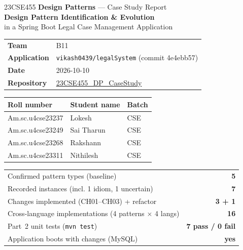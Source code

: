 \documentclass[11pt,a4paper]{article}
\begin{document}
\thispagestyle{empty}
\begin{tcolorbox}[enhanced,colback=brand,colframe=brand,arc=3pt,boxrule=0pt,
  left=16pt,right=16pt,top=14pt,bottom=14pt]
  {\color{white}\fontsize{13}{15}\selectfont 23CSE455 \textbf{Design Patterns} --- Case Study Report}\\[6pt]
  {\color{white}\LARGE\bfseries Design Pattern Identification \& Evolution}\\[2pt]
  {\color{white}\large in a Spring Boot Legal Case Management Application}
\end{tcolorbox}

\vspace{4pt}
\begin{tabularx}{\linewidth}{@{}lX@{}}
\textbf{Team} & B11\\
\textbf{Application} & \texttt{vikash0439/legalSystem} \textcolor{muted}{(commit 4e4ebb57)}\\
\textbf{Date} & 2026-10-10\\
\textbf{Repository} & \href{https://github.com/aswathymohan-amrita/23CSE455_DP_CaseStudy}{23CSE455\_DP\_CaseStudy}\\
\end{tabularx}

\vspace{6pt}
\begin{tabularx}{\linewidth}{@{}llX@{}}\toprule
\rowcolor{panelbg}\textbf{Roll number} & \textbf{Student name} & \textbf{Batch}\\\midrule
Am.sc.u4cse23237 & Lokesh & CSE\\
Am.sc.u4cse23249 & Sai Tharun & CSE\\
Am.sc.u4cse23268 & Rakshann & CSE\\
Am.sc.u4cse23311 & Nithilesh & CSE\\\bottomrule
\end{tabularx}

\begin{tcolorbox}[enhanced,colback=panelbg,colframe=accent,arc=3pt,boxrule=1pt,
  left=12pt,right=12pt,top=10pt,bottom=10pt,title=\textbf{At a glance},
  coltitle=white,colbacktitle=accent,fonttitle=\bfseries]
\begin{tabularx}{\linewidth}{@{}Xr@{}}
Confirmed pattern types (baseline) & \textbf{5}\\
Recorded instances (incl. 1 idiom, 1 uncertain) & \textbf{7}\\
Changes implemented (CH01--CH03) + refactor & \textbf{3 + 1}\\
Cross-language implementations (4 patterns $\times$ 4 langs) & \textbf{16}\\
Part~2 unit tests (\texttt{mvn test}) & \textbf{7 pass / 0 fail}\\
Application boots with changes (MySQL) & \textbf{yes}\\
\end{tabularx}
\end{tcolorbox}
\end{document}
